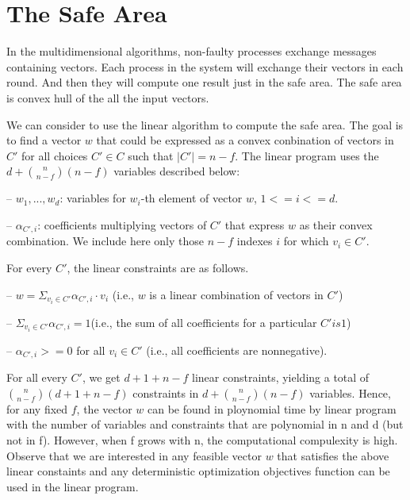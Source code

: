 \section{The Safe Area}
In the multidimensional algorithms, non-faulty processes exchange messages
containing vectors. Each process in the system will exchange their vectors
in each round. And then they will compute one result just in the safe area.
The safe area is convex hull of the all the input vectors\cite{perles2007generalization}.

We can consider to use the linear algorithm to compute the safe area.
The goal is to find a vector $w$ that could be expressed as a convex conbination
of vectors in $C\prime$ for all choices $C\prime \in C$ such that $|C\prime| = n - f$. 
The linear program uses the $d + \binom{n}{n - f}(n - f)$ variables described below\cite{mendes2015multidimensional}:


-- $w_1, ..., w_{d}$: variables for $w_{i}$-th element of vector $w$, $1 <= i <= d$.

-- $\alpha_{C\prime, i}$: coefficients multiplying vectors of $C\prime$ that express $w$
as their convex combination. We include here only those $n - f$ indexes $i$ for which $v_{i} \in C\prime$.

For every $C\prime$, the linear constraints are as follows.

-- $w = \Sigma_{v_{i} \in C\prime}\alpha_{C\prime, i} \cdot v_{i}$ (i.e., $w$ is a linear combination of vectors in $C\prime$)

-- $\Sigma_{v_{i} \in C\prime}\alpha_{C\prime, i} = 1$(i.e., the sum of all coefficients for a particular $C\prime is 1$)

-- $\alpha_{C\prime, i} >= 0$ for all $v_{i} \in C\prime$ (i.e., all coefficients are nonnegative).

For all every $C\prime$, we get $d + 1 + n - f$ linear constraints, yielding a total of 
$\binom{n}{n - f}(d + 1 + n - f)$ constraints in $d + \binom{n}{n - f}(n - f)$ variables. 
Hence, for any fixed $f$, the vector $w$ can be found in ploynomial time by linear program
with the number of variables and constraints that are polynomial in n and d (but not in f).
However, when f grows with n, the computational compulexity is high. Observe that we are
interested in any feasible vector $w$ that satisfies the above linear constaints and any
deterministic optimization objectives function can be used in the linear program.
